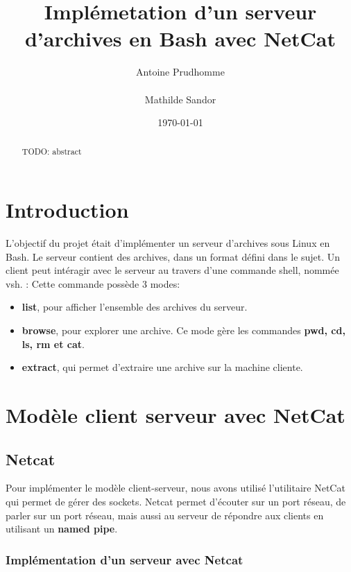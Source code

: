 \documentclass[titlepage]{article}
\begin{document}
	\title{Implémetation d'un serveur d'archives en Bash avec NetCat}
	\author{Antoine Prudhomme \\ \\ Mathilde Sandor}
	\date{\today}

	\maketitle

	\begin{abstract}
		TODO: abstract 
	\end{abstract}

	\section{Introduction}
	L'objectif du projet était d'implémenter un serveur d'archives sous Linux en Bash.
	Le serveur contient des archives, dans un format défini dans le sujet. 
	Un client peut intéragir avec le serveur au travers d'une commande shell, nommée vsh. :
	Cette commande possède 3 modes:
	\begin{itemize}  
	\item \textbf{list}, pour afficher l'ensemble des archives du serveur.
	\item \textbf{browse}, pour explorer une archive. Ce mode gère les commandes \textbf{pwd, cd, ls, rm et cat}.
	\item \textbf{extract}, qui permet d'extraire une archive sur la machine cliente.
	\end{itemize}   

	\section{Modèle client serveur avec NetCat}
	
	\subsection{Netcat} 
	Pour implémenter le modèle client-serveur, nous avons utilisé l'utilitaire NetCat qui permet de gérer des sockets.
	Netcat permet d'écouter sur un port réseau, de parler sur un port réseau, mais aussi au serveur de répondre aux clients en utilisant un \textbf{named pipe}.

	\subsubsection{Implémentation d'un serveur avec Netcat}
\end{document}
